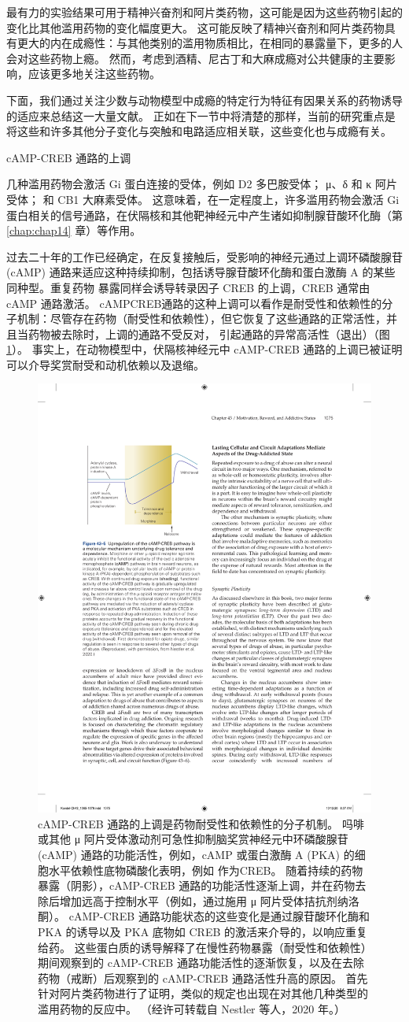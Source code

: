最有力的实验结果可用于精神兴奋剂和阿片类药物，这可能是因为这些药物引起的变化比其他滥用药物的变化幅度更大。 这可能反映了精神兴奋剂和阿片类药物具有更大的内在成瘾性：与其他类别的滥用物质相比，在相同的暴露量下，更多的人会对这些药物上瘾。 然而，考虑到酒精、尼古丁和大麻成瘾对公共健康的主要影响，应该更多地关注这些药物。

下面，我们通过关注少数与动物模型中成瘾的特定行为特征有因果关系的药物诱导的适应来总结这一大量文献。 正如在下一节中将清楚的那样，当前的研究重点是将这些和许多其他分子变化与突触和电路适应相关联，这些变化也与成瘾有关。

cAMP-CREB 通路的上调

几种滥用药物会激活 Gi 蛋白连接的受体，例如 D2 多巴胺受体； μ、δ 和 κ 阿片受体； 和 CB1 大麻素受体。 这意味着，在一定程度上，许多滥用药物会激活 Gi 蛋白相关的信号通路，在伏隔核和其他靶神经元中产生诸如抑制腺苷酸环化酶（第 \ref{chap:chap14} 章）等作用。

过去二十年的工作已经确定，在反复接触后，受影响的神经元通过上调环磷酸腺苷 (cAMP) 通路来适应这种持续抑制，包括诱导腺苷酸环化酶和蛋白激酶 A 的某些同种型。重复药物 暴露同样会诱导转录因子 CREB 的上调，CREB 通常由 cAMP 通路激活。 cAMPCREB通路的这种上调可以看作是耐受性和依赖性的分子机制：尽管存在药物（耐受性和依赖性），但它恢复了这些通路的正常活性，并且当药物被去除时，上调的通路不受反对， 引起通路的异常高活性（退出）（图 \ref{fig:43_5}）。 
事实上，在动物模型中，伏隔核神经元中 cAMP-CREB 通路的上调已被证明可以介导奖赏耐受和动机依赖以及退缩。

\begin{figure}[htbp]
	\centering
	\includegraphics[width=0.5\linewidth]{chap43/fig_43_5}
	\caption{cAMP-CREB 通路的上调是药物耐受性和依赖性的分子机制。 吗啡或其他 μ 阿片受体激动剂可急性抑制脑奖赏神经元中环磷酸腺苷 (cAMP) 通路的功能活性，例如，cAMP 或蛋白激酶 A (PKA) 的细胞水平依赖性底物磷酸化表明，例如 作为CREB。 随着持续的药物暴露（阴影），cAMP-CREB 通路的功能活性逐渐上调，并在药物去除后增加远高于控制水平（例如，通过施用 μ 阿片受体拮抗剂纳洛酮）。 cAMP-CREB 通路功能状态的这些变化是通过腺苷酸环化酶和 PKA 的诱导以及 PKA 底物如 CREB 的激活来介导的，以响应重复给药。 这些蛋白质的诱导解释了在慢性药物暴露（耐受性和依赖性）期间观察到的 cAMP-CREB 通路功能活性的逐渐恢复，以及在去除药物（戒断）后观察到的 cAMP-CREB 通路活性升高的原因。 首先针对阿片类药物进行了证明，类似的规定也出现在对其他几种类型的滥用药物的反应中。 （经许可转载自 Nestler 等人，2020 年。）}
	\label{fig:43_5}
\end{figure}

